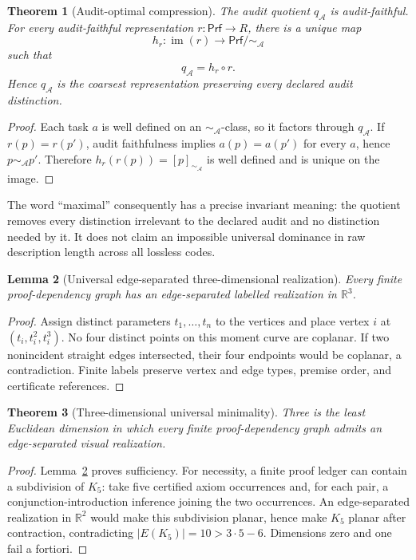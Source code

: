 \documentclass[11pt]{article}
\newcommand{\Proofs}{\ensuremath{\mathsf{Prf}}}
\newcommand{\AuditQuot}{\ensuremath{q_{\mathcal A}}}
\newcommand{\AuditEq}{\ensuremath{\sim_{\mathcal A}}}
\newcommand{\Rthree}{\ensuremath{\mathbb R^3}}
\theoremstyle{plain}
\newtheorem{theorem}{Theorem}[section]
\newtheorem{lemma}[theorem]{Lemma}
\theoremstyle{definition}
\theoremstyle{remark}
\begin{document}
\begin{theorem}[Audit-optimal compression]
\label{thm:auditquot-v9}
The audit quotient $\AuditQuot$ is audit-faithful.  For every
audit-faithful representation $r:\Proofs\to R$, there is a unique map
\[
h_r:\operatorname{im}(r)\to\Proofs/{\AuditEq}
\]
such that
\[
\AuditQuot=h_r\circ r.
\]
Hence $\AuditQuot$ is the coarsest representation preserving every declared
audit distinction.
\end{theorem}

\begin{proof}
Each task $a$ is well defined on an $\AuditEq$-class, so it factors through
$\AuditQuot$.  If $r(p)=r(p')$, audit faithfulness implies
$a(p)=a(p')$ for every $a$, hence $p\AuditEq p'$.  Therefore
$h_r(r(p))=[p]_{\AuditEq}$ is well defined and is unique on the image.
\end{proof}

The word ``maximal'' consequently has a precise invariant meaning: the quotient
removes every distinction irrelevant to the declared audit and no distinction
needed by it.  It does not claim an impossible universal dominance in raw
description length across all lossless codes.

\begin{lemma}[Universal edge-separated three-dimensional realization]
\label{lem:3d-v9}
Every finite proof-dependency graph has an edge-separated labelled realization
in $\Rthree$.
\end{lemma}

\begin{proof}
Assign distinct parameters $t_1,\ldots,t_n$ to the vertices and place vertex
$i$ at $(t_i,t_i^2,t_i^3)$.  No four distinct points on this moment curve are
coplanar.  If two nonincident straight edges intersected, their four endpoints
would be coplanar, a contradiction.  Finite labels preserve vertex and edge
types, premise order, and certificate references.
\end{proof}

\begin{theorem}[Three-dimensional universal minimality]
\label{thm:3dmin-v9}
Three is the least Euclidean dimension in which every finite
proof-dependency graph admits an edge-separated visual realization.
\end{theorem}

\begin{proof}
Lemma~\ref{lem:3d-v9} proves sufficiency.  For necessity, a finite proof ledger
can contain a subdivision of $K_5$: take five certified axiom occurrences and,
for each pair, a conjunction-introduction inference joining the two occurrences.
An edge-separated realization in $\mathbb R^2$ would make this subdivision
planar, hence make $K_5$ planar after contraction, contradicting
$|E(K_5)|=10>3\cdot5-6$.  Dimensions zero and one fail a fortiori.
\end{proof}
\end{document}
